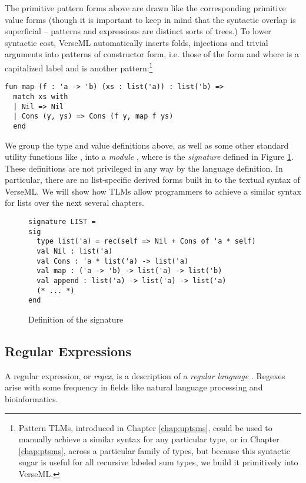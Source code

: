 The primitive pattern forms above are drawn like the corresponding primitive value forms (though it is important to keep in mind that the syntactic overlap is superficial -- patterns and expressions are distinct sorts of trees.) To lower syntactic cost, VerseML automatically inserts folds, injections and trivial arguments into patterns of constructor form, i.e. those of the form  and  where  is a capitalized label and  is another pattern:\footnote{Pattern TLMs, introduced in Chapter \ref{chap:uptsms}, could be used to manually achieve a similar syntax for any particular type, or in Chapter \ref{chap:ptsms}, across a particular family of types, but because this syntactic sugar is useful for all recursive labeled sum types, we build it primitively into VerseML.}
\begin{lstlisting}[numbers=none]
fun map (f : 'a -> 'b) (xs : list('a)) : list('b) => 
  match xs with 
  | Nil => Nil 
  | Cons (y, ys) => Cons (f y, map f ys)
  end
\end{lstlisting}

We group the type and value definitions above, as well as some other standard utility functions like , into a \emph{module} , where  is the \emph{signature} defined in Figure \ref{fig:LIST}. These definitions are not privileged in any way by the language definition. In particular, there are no list-specific derived forms built in to the textual syntax of VerseML. We will show how TLMs allow programmers to achieve a similar syntax for lists over the next several chapters.

\begin{figure}[h!]
\begin{lstlisting}[numbers=none]
signature LIST = 
sig 
  type list('a) = rec(self => Nil + Cons of 'a * self)
  val Nil : list('a)
  val Cons : 'a * list('a) -> list('a)
  val map : ('a -> 'b) -> list('a) -> list('b)
  val append : list('a) -> list('a) -> list('a)
  (* ... *)
end
\end{lstlisting}
\caption{Definition of the  signature}
\label{fig:LIST}
\end{figure}

\subsection{Regular Expressions}\label{sec:syntax-examples-regexps}
A regular expression, or \emph{regex}, is a description of a \emph{regular language} \cite{Thompson:1968:PTR:363347.363387}. Regexes arise with some frequency in fields like natural language processing and bioinformatics.


